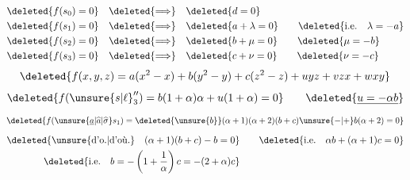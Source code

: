 

\[
\begin{aligned}
\deleted{f(s_0)=0}&\quad\deleted{\Longrightarrow}\quad\deleted{d=0}\\
\deleted{f(s_1)=0}&\quad\deleted{\Longrightarrow}\quad\deleted{a+\lambda=0}\qquad\deleted{\text{i.e.}\quad\lambda=-a}\\
\deleted{f(s_2)=0}&\quad\deleted{\Longrightarrow}\quad\deleted{b+\mu=0}\qquad\deleted{\mu=-b}\\
\deleted{f(s_3)=0}&\quad\deleted{\Longrightarrow}\quad\deleted{c+\nu=0}\qquad\deleted{\nu=-c}
\end{aligned}
\]
\[
\deleted{f(x,y,z)=a(x^2-x)+b(y^2-y)+c(z^2-z)+uyz+vzx+wxy}
\]
\[
\deleted{f({\unsure{s|\ell}}''_3)=b(1+\alpha)\alpha+u(1+\alpha)=0}
\qquad\deleted{\underline{u=-\alpha b}}
\]
\[
\deleted{f(\unsure{\underline a|\widehat a|\widehat\sigma}s_1)=\deleted{\unsure{b}}(\alpha+1)(\alpha+2)(b+c)\unsure{-|+}b(\alpha+2)=0}
\]
\[
\begin{aligned}
\deleted{\text{\unsure{d'o.|d'où.}}\quad(\alpha+1)(b+c)-b=0}
&\qquad\deleted{\text{i.e.}\quad\alpha b+(\alpha+1)c=0}\\
\deleted{\text{i.e.}\quad b=-\left(1+\frac1\alpha\right)c=-(2+\alpha)c}&
\end{aligned}
\]


